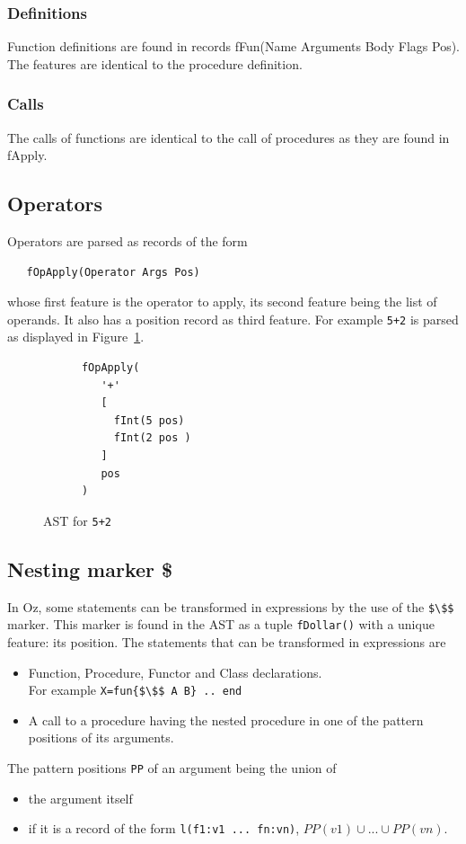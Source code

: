 \documentclass[a4paper]{memoir}
\begin{document}
\subsubsection{Definitions}
Function definitions are found in records fFun(Name Arguments Body Flags Pos). The features are identical to the procedure definition.
\subsubsection{Calls}
The calls of functions are identical to the call of procedures as they are found in fApply.

\subsection{Operators}\label{sec:input:operators}
Operators are parsed as records of the form
\begin{lstlisting}
   fOpApply(Operator Args Pos)
\end{lstlisting}
 whose first feature is the operator to
apply, its second feature being the list of operands. It also has a position
record as third feature. For example
\lstinline!5+2! is parsed as displayed in Figure~\ref{fig:opexample}.
\begin{figure}[h]
\begin{lstlisting}
      fOpApply(
         '+'
         [
           fInt(5 pos)
           fInt(2 pos )
         ]
         pos
      )
\end{lstlisting}
\caption{AST for \lstinline!5+2!}
\label{fig:opexample}
\end{figure}

\subsection{Nesting marker \$}\label{sec:input:nestingmarker}
In Oz, some statements can be transformed in expressions by the use of the
\lstinline[mathescape]!$\$$!
marker. This marker is found in the AST as a tuple \lstinline!fDollar()! with a unique
feature: its position.
The statements that can be transformed in expressions are
\begin{itemize}
  \item Function, Procedure, Functor and Class declarations. \\For example
    \lstinline[mathescape]!X=fun{$\$$ A B} .. end!
  \item A call to a procedure having the nested procedure in one of the pattern positions of its arguments.
\end{itemize}
The pattern positions \lstinline!PP! of an argument being the union of 
\begin{itemize}
  \item the argument itself
  \item if it is a record of the form \lstinline!l(f1:v1 ... fn:vn)!, $PP(v1) \cup ... \cup PP(vn)$.
\end{itemize}
\end{document}
